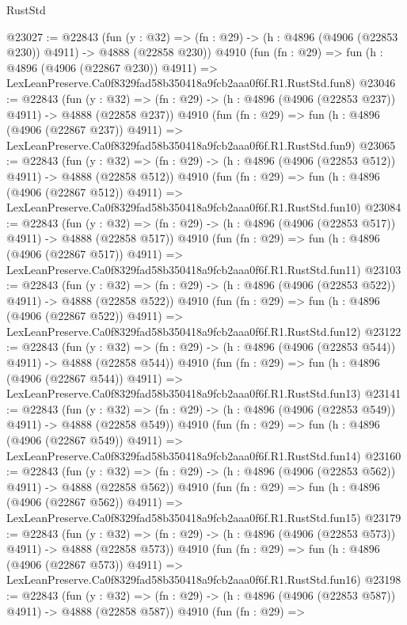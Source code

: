 \begin{lexlean}{RustStd}
\begin{coremodule}
@23027 := @22843
    (fun (y : @32) => (fn : @29) -> (h : @4896 (@4906 (@22853 @230)) @4911) -> @4888 (@22858 @230))
    @4910
    (fun (fn : @29) =>
    fun (h : @4896 (@4906 (@22867 @230)) @4911) =>
    LexLeanPreserve.Ca0f8329fad58b350418a9fcb2aaa0f6f.R1.RustStd.fun8)
@23046 := @22843
    (fun (y : @32) => (fn : @29) -> (h : @4896 (@4906 (@22853 @237)) @4911) -> @4888 (@22858 @237))
    @4910
    (fun (fn : @29) =>
    fun (h : @4896 (@4906 (@22867 @237)) @4911) =>
    LexLeanPreserve.Ca0f8329fad58b350418a9fcb2aaa0f6f.R1.RustStd.fun9)
@23065 := @22843
    (fun (y : @32) => (fn : @29) -> (h : @4896 (@4906 (@22853 @512)) @4911) -> @4888 (@22858 @512))
    @4910
    (fun (fn : @29) =>
    fun (h : @4896 (@4906 (@22867 @512)) @4911) =>
    LexLeanPreserve.Ca0f8329fad58b350418a9fcb2aaa0f6f.R1.RustStd.fun10)
@23084 := @22843
    (fun (y : @32) => (fn : @29) -> (h : @4896 (@4906 (@22853 @517)) @4911) -> @4888 (@22858 @517))
    @4910
    (fun (fn : @29) =>
    fun (h : @4896 (@4906 (@22867 @517)) @4911) =>
    LexLeanPreserve.Ca0f8329fad58b350418a9fcb2aaa0f6f.R1.RustStd.fun11)
@23103 := @22843
    (fun (y : @32) => (fn : @29) -> (h : @4896 (@4906 (@22853 @522)) @4911) -> @4888 (@22858 @522))
    @4910
    (fun (fn : @29) =>
    fun (h : @4896 (@4906 (@22867 @522)) @4911) =>
    LexLeanPreserve.Ca0f8329fad58b350418a9fcb2aaa0f6f.R1.RustStd.fun12)
@23122 := @22843
    (fun (y : @32) => (fn : @29) -> (h : @4896 (@4906 (@22853 @544)) @4911) -> @4888 (@22858 @544))
    @4910
    (fun (fn : @29) =>
    fun (h : @4896 (@4906 (@22867 @544)) @4911) =>
    LexLeanPreserve.Ca0f8329fad58b350418a9fcb2aaa0f6f.R1.RustStd.fun13)
@23141 := @22843
    (fun (y : @32) => (fn : @29) -> (h : @4896 (@4906 (@22853 @549)) @4911) -> @4888 (@22858 @549))
    @4910
    (fun (fn : @29) =>
    fun (h : @4896 (@4906 (@22867 @549)) @4911) =>
    LexLeanPreserve.Ca0f8329fad58b350418a9fcb2aaa0f6f.R1.RustStd.fun14)
@23160 := @22843
    (fun (y : @32) => (fn : @29) -> (h : @4896 (@4906 (@22853 @562)) @4911) -> @4888 (@22858 @562))
    @4910
    (fun (fn : @29) =>
    fun (h : @4896 (@4906 (@22867 @562)) @4911) =>
    LexLeanPreserve.Ca0f8329fad58b350418a9fcb2aaa0f6f.R1.RustStd.fun15)
@23179 := @22843
    (fun (y : @32) => (fn : @29) -> (h : @4896 (@4906 (@22853 @573)) @4911) -> @4888 (@22858 @573))
    @4910
    (fun (fn : @29) =>
    fun (h : @4896 (@4906 (@22867 @573)) @4911) =>
    LexLeanPreserve.Ca0f8329fad58b350418a9fcb2aaa0f6f.R1.RustStd.fun16)
@23198 := @22843
    (fun (y : @32) => (fn : @29) -> (h : @4896 (@4906 (@22853 @587)) @4911) -> @4888 (@22858 @587))
    @4910
    (fun (fn : @29) =>

\end{coremodule}
\end{lexlean}
